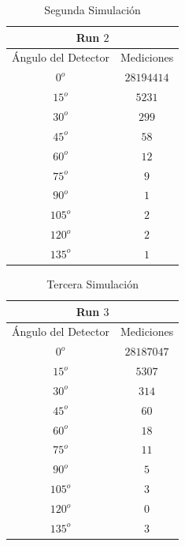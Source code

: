 \documentclass[conference]{IEEEtran}
\begin{document}
\begin{table}[H]
	\centering
	\caption{Segunda Simulación}
	\begin{tabular}{||c|c||}
	\hline
	\hline
	\multicolumn{2}{||c||}{Run $2$} \\
	\hline
	\hline
	Ángulo del Detector & Mediciones \\
	\hline
	$0^o$   & $28194414$ \\
	$15^o$  & $5231$     \\
	$30^o$  & $299$      \\ 
	$45^o$  & $58$       \\
	$60^o$  & $12$       \\
	$75^o$  & $9$        \\
	$90^o$  & $1$        \\
	$105^o$ & $2$        \\
	$120^o$ & $2$        \\
	$135^o$ & $1$        \\
	\hline
	\hline
	\end{tabular}
\end{table}




\begin{table}[H]
	\centering
	\caption{Tercera Simulación}
	\begin{tabular}{||c|c||}
	\hline
	\hline
	\multicolumn{2}{||c||}{Run $3$} \\
	\hline
	\hline
	Ángulo del Detector & Mediciones \\
	\hline
	$0^o$   & $28187047$ \\
	$15^o$  & $5307$     \\
	$30^o$  & $314$      \\ 
	$45^o$  & $60$       \\
	$60^o$  & $18$       \\
	$75^o$  & $11$        \\
	$90^o$  & $5$        \\
	$105^o$ & $3$        \\
	$120^o$ & $0$        \\
	$135^o$ & $3$        \\
	\hline
	\hline
	\end{tabular}
\end{table}
\end{document}
